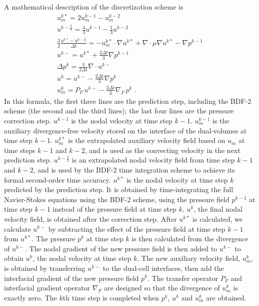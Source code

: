 A mathematical description of the discretization scheme is
\begin{equation} \begin{split} \label{pred-corr}
   u_m^{k*} = 2 u_m^{k-1} - u_m^{k-2} \\
   u^{k-\frac23} = \frac43 u^{k-1} - \frac13 u^{k-2} \\
   \frac32 \frac{u^{k*} - u^{k-\frac23}}{\Delta t} =
 - u_m^{k*} \cdot \nabla u^{k*} + \nabla \cdot \mu \nabla u^{k*}
 - \nabla p^{k-1}  \\
   u^{k-} = u^{k*} + \frac{2 \Delta t}{3} \nabla p^{k-1}  \\
   \Delta p^k = \frac3{2 \Delta t} \nabla \cdot u^{k-}  \\
   u^k = u^{k-} - \frac{2 \Delta t}{3} \nabla p^k  \\
   u_m^k = P_F\, u^{k-} - \frac{2\Delta t}{3} \nabla_F\, p^k \;.
\end{split} \end{equation}
In this formula, the first three lines are the prediction step, including
the BDF-2 scheme (the second and the third lines); the last
four lines are the pressure correction step.  $u^{k-1}$ is the nodal velocity at
time step $k-1$.  $u_m^{k-1}$ is the auxiliary divergence-free velocity
stored on the interface of the dual-volumes at time step $k-1$.
$u_m^{k*}$ is the extrapolated auxiliary velocity field based on $u_m$
at time steps $k-1$ and $k-2$, and is used as the convecting velocity
in the next prediction step.
$u^{k-\frac23}$ is an extrapolated nodal velocity field from time step $k-1$
and $k-2$, and is used by the BDF-2 time integration scheme to achieve
its formal second-order time accuracy.  $u^{k*}$ is the nodal velocity
at time step $k$ predicted by the prediction step.  It is obtained by
time-integrating the full Navier-Stokes equations using the BDF-2 scheme,
using the pressure field $p^{k-1}$ at time step $k-1$ instead of the
pressure field at time step $k$.
$u^k$, the final nodal velocity field, is obtained after the correction step.
After $u^{k*}$ is calculated, we calculate $u^{k-}$ by subtracting the effect
of the pressure field at time step $k-1$ from $u^{k*}$.
The pressure $p^k$ at time step $k$ is then calculated from the divergence of
$u^{k-}$.  The nodal gradient of the new pressure field is then added to
$u^{k-}$ to obtain $u^k$, the nodal velocity at time step $k$.
The new auxiliary velocity field, $u_m^k$, is obtained by transferring $u^{k-}$
to the dual-cell interfaces, then add the interfacial gradient of the new
pressure field $p^k$.  The transfer operator $P_F$ and interfacial gradient
operator $\nabla_F$ are designed so that the divergence of $u_m^k$ is exactly
zero.  The $k$th time step is completed when $p^k$, $u^k$ and $u_m^k$ are
obtained.

